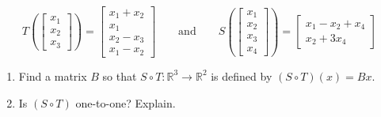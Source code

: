 \documentclass[11pt]{article}
\begin{document}
\begin{displaymath}
T\left(\left[ \begin{array}{r} x_1 \\ x_2 \\ x_3 \end{array}\right]\right) = 
\left[ \begin{array}{c} x_1+x_2 \\ x_1 \\ x_2-x_3 \\ x_1-x_2 \end{array}\right]
\quad\quad\textrm{and}\quad\quad
S\left(\left[ \begin{array}{r} x_1 \\ x_2 \\ x_3 \\ x_4 \end{array}\right]\right) = 
\left[ \begin{array}{c} x_1-x_2+x_4 \\ x_2+3x_4 \end{array}\right]
\end{displaymath}

\begin{enumerate}
	\item {Find a matrix $B$ so that $S\circ T:\mathbb{R}^3\to\mathbb{R}^2$ is defined by $(S\circ T)(x) = Bx$.}
	\item {Is $(S\circ T)$ one-to-one?  Explain.}
\end{enumerate}
\end{document}
